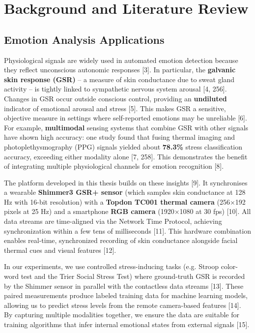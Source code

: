 \documentclass{article}
\begin{document}
    \chapter{Background and Literature Review}

    \section{Emotion Analysis Applications}
    Physiological signals are widely used in automated emotion detection because they reflect unconscious autonomic responses [3]. In particular, the \textbf{galvanic skin response (GSR)} – a measure of skin conductance due to sweat gland activity – is tightly linked to sympathetic nervous system arousal [4, 256]. Changes in GSR occur outside conscious control, providing an \textbf{undiluted} indicator of emotional arousal and stress [5]. This makes GSR a sensitive, objective measure in settings where self-reported emotions may be unreliable [6]. For example, \textbf{multimodal} sensing systems that combine GSR with other signals have shown high accuracy: one study found that fusing thermal imaging and photoplethysmography (PPG) signals yielded about \textbf{78.3\%} stress classification accuracy, exceeding either modality alone [7, 258]. This demonstrates the benefit of integrating multiple physiological channels for emotion recognition [8].

    The platform developed in this thesis builds on these insights [9]. It synchronises a wearable \textbf{Shimmer3 GSR+ sensor} (which samples skin conductance at 128 Hz with 16-bit resolution) with a \textbf{Topdon TC001 thermal camera} (256×192 pixels at 25 Hz) and a smartphone \textbf{RGB camera} (1920×1080 at 30 fps) [10]. All data streams are time-aligned via the Network Time Protocol, achieving synchronization within a few tens of milliseconds [11]. This hardware combination enables real-time, synchronized recording of skin conductance alongside facial thermal cues and visual features [12].

    In our experiments, we use controlled stress-inducing tasks (e.g. Stroop color-word test and the Trier Social Stress Test) where ground-truth GSR is recorded by the Shimmer sensor in parallel with the contactless data streams [13]. These paired measurements produce labeled training data for machine learning models, allowing us to predict stress levels from the remote camera-based features [14]. By capturing multiple modalities together, we ensure the data are suitable for training algorithms that infer internal emotional states from external signals [15].
\end{document}
